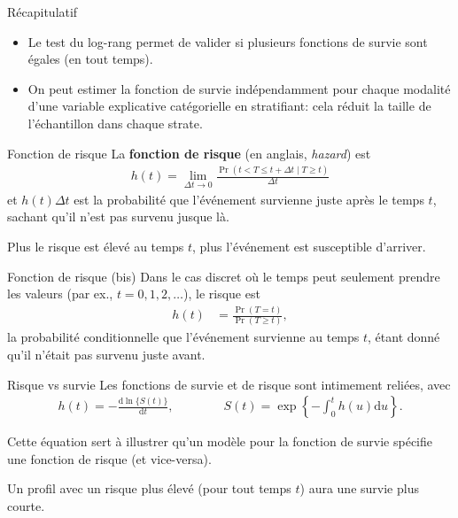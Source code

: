 \documentclass[
  ignorenonframetext,
]{beamer}
\providecommand{\tightlist}{%
  \setlength{\itemsep}{0pt}\setlength{\parskip}{0pt}}
\begin{document}
\begin{frame}{Récapitulatif}
\protect{}\label{ruxe9capitulatif-4}
\begin{itemize}
\tightlist
\item
  Le test du log-rang permet de valider si plusieurs fonctions de survie
  sont égales (en tout temps).
\item
  On peut estimer la fonction de survie indépendamment pour chaque
  modalité d'une variable explicative catégorielle en stratifiant: cela
  réduit la taille de l'échantillon dans chaque strate.
\end{itemize}
\end{frame}

\begin{frame}{Fonction de risque}
\protect{}\label{fonction-de-risque}
La \textbf{fonction de risque} (en anglais, \emph{hazard}) est
\begin{align*}
h(t) =  \lim_{\Delta t \to 0} \frac{\Pr( t < T  \leq t + \Delta t \mid T \geq t)}{\Delta t}
\end{align*} et \(h(t) \Delta t\) est la probabilité que l'événement
survienne juste après le temps \(t\), sachant qu'il n'est pas survenu
jusque là.

Plus le risque est élevé au temps \(t\), plus l'événement est
susceptible d'arriver.
\end{frame}

\begin{frame}{Fonction de risque (bis)}
\protect{}\label{fonction-de-risque-bis}
Dans le cas discret où le temps peut seulement prendre les valeurs (par
ex., \(t=0, 1, 2, \ldots\)), le risque est \begin{align*}
h(t) &= \frac{\Pr(T=t)}{\Pr(T \geq t)},
\end{align*} la probabilité conditionnelle que l'événement survienne au
temps \(t\), étant donné qu'il n'était pas survenu juste avant.
\end{frame}

\begin{frame}{Risque vs survie}
\protect{}\label{risque-vs-survie}
Les fonctions de survie et de risque sont intimement reliées, avec
\begin{align*}
h(t) = - \frac{\mathrm{d} \ln\{S(t)\}}{\mathrm{d} t}, \qquad \qquad S(t) = \exp \left\{ -\int_0^t h(u) \mathrm{d} u\right\}.
\end{align*}

Cette équation sert à illustrer qu'un modèle pour la fonction de survie
spécifie une fonction de risque (et vice-versa).

Un profil avec un risque plus élevé (pour tout temps \(t\)) aura une
survie plus courte.
\end{frame}
\end{document}
